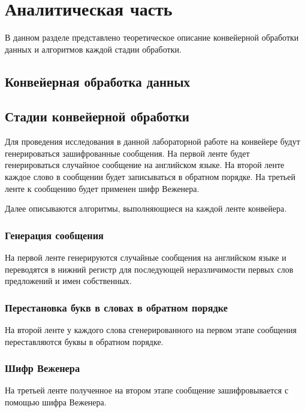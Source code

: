 \chapter{Аналитическая часть}

В данном разделе представлено теоретическое описание конвейерной обработки
данных и алгоритмов каждой стадии обработки.

\section{Конвейерная обработка данных}



\section{Стадии конвейерной обработки}

Для проведения исследования в данной лабораторной работе на конвейере будут
генерироваться зашифрованные сообщения. На первой ленте будет генерироваться
случайное сообщение на английском языке. На второй ленте каждое слово в
сообщении будет записываться в обратном порядке. На третьей ленте к сообщению
будет применен шифр Веженера.

Далее описываются алгоритмы, выполняющиеся на каждой ленте конвейера.

\subsection{Генерация сообщения}

На первой ленте генерируются случайные сообщения на английском языке и
переводятся в нижний регистр для последующей неразличимости первых слов
предложений и имен собственных.

\subsection{Перестановка букв в словах в обратном порядке}

На второй ленте у каждого слова сгенерированного на первом этапе сообщения
переставляются буквы в обратном порядке.

\subsection{Шифр Веженера}

На третьей ленте полученное на втором этапе сообщение зашифровывается с
помощью шифра Веженера.


